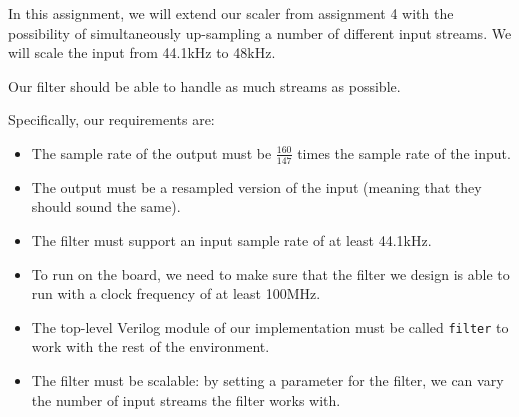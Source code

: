 In this assignment, we will extend our scaler from assignment 4 with the possibility of simultaneously up-sampling a number of different input streams.
We will scale the input from 44.1kHz to 48kHz.

Our filter should be able to handle as much streams as possible.

Specifically, our requirements are:

\begin{itemize}
	\item The sample rate of the output must be $\frac{160}{147}$ times the sample rate of the input.
	\item The output must be a resampled version of the input (meaning that they should sound the same).
	\item The filter must support an input sample rate of at least 44.1kHz.
	\item To run on the board, we need to make sure that the filter we design is able to run with a clock frequency of at least 100MHz.
	\item The top-level Verilog module of our implementation must be called \texttt{filter} to work with the rest of the environment.
	\item The filter must be scalable: by setting a parameter for the filter, we can vary the number of input streams the filter works with.
\end{itemize}
